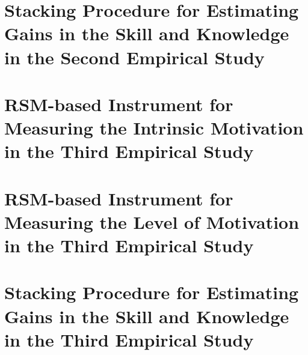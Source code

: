 \section{Stacking Procedure for Estimating Gains in the Skill and Knowledge in the Second Empirical Study}
\label{sec:irt-learning-outcomes-second-study}

\section{RSM-based Instrument for Measuring the Intrinsic Motivation in the Third Empirical Study}
\label{sec:irt-intrinsic-motivation-third-study}

\section{RSM-based Instrument for Measuring the Level of Motivation in the Third Empirical Study}
\label{sec:irt-level-motivation-third-study}



\section{Stacking Procedure for Estimating Gains in the Skill and Knowledge in the Third Empirical Study}
\label{sec:irt-learning-outcomes-third-study}
